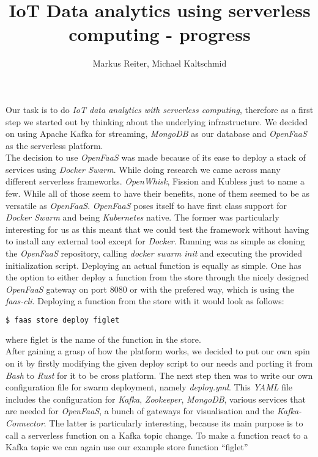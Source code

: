 \documentclass{article}
\title{IoT Data analytics using serverless computing - progress}
\author{Markus Reiter, Michael Kaltschmid}
\date{}
\begin{document}
  \maketitle
  Our task is to do \textit{IoT data analytics with serverless computing}, therefore as a first step we started out by thinking about the underlying infrastructure. We decided on using Apache Kafka for streaming,  \textit{MongoDB} as our database and \textit{OpenFaaS} as the serverless platform. \\
  The decision to use \textit{OpenFaaS} was made because of its ease to deploy a stack of services using \textit{Docker Swarm}. 
  While doing research we came across many different serverless frameworks. \textit{OpenWhisk}, Fission and Kubless just to name a few. While all of those seem to have their benefits, none of them seemed to be as versatile as \textit{OpenFaaS}. \textit{OpenFaaS} poses itself to have first class support for \textit{Docker Swarm} and being \textit{Kubernetes} native. The former was particularly interesting for us as this meant that we could test the framework without having to install any external tool except for  \textit{Docker}. Running was as simple as cloning the \textit{OpenFaaS} repository, calling \textit{docker swarm init} and executing the provided initialization script. Deploying an actual function is equally as simple. One has the option to either deploy a function from the store through the nicely designed  \textit{OpenFaaS} gateway on port 8080 or with the prefered way, which is using the \textit{faas-cli}. Deploying a function from the store with it would look as follows:

  \begin{lstlisting}[language=bash]
    $ faas store deploy figlet
  \end{lstlisting}

  where figlet is the name of the function in the store. \\
  After gaining a grasp of how the platform works, we decided to put our own spin on it by firstly modifying the given deploy script to our needs and porting it from \textit{Bash} to \textit{Rust} for it to be cross platform. The next step then was to write our own configuration file for swarm deployment, namely \textit{deploy.yml}. This \textit{YAML} file includes the configuration for \textit{Kafka}, \textit{Zookeeper}, \textit{MongoDB}, various services that are needed for \textit{OpenFaaS}, a bunch of gateways for visualisation and the \textit{Kafka-Connector}. The latter is particularly interesting, because its main purpose is to call a serverless function on a Kafka topic change. To make a function react to a Kafka topic we can again use our example store function “figlet”
\end{document}
